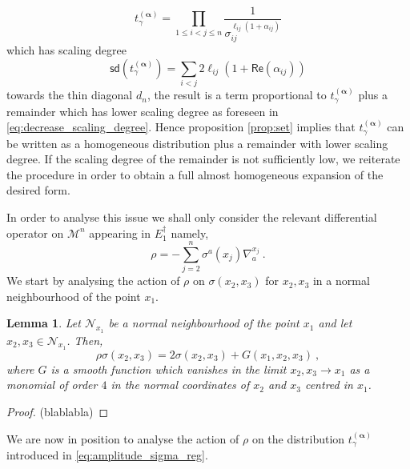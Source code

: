 \documentclass[12pt]{book}
\newcommand{\sd}{\mathsf{sd}}
\renewcommand{\Re}{\mathsf{Re}}
\newcommand{\Mcal}{\mathcal{M}}
\newcommand{\Ncal}{\mathcal{N}}
\theoremstyle{break}
\newtheorem{lemma}{Lemma}
\begin{document}
%
\begin{equation*}
t_\gamma^{(\boldsymbol{\alpha})}=\prod_{1\leq i < j \leq n } \frac{1}{\sigma_{ij}^{\ell_{ij}(1+ \alpha_{ij})}} 
\end{equation*}
%
which has scaling degree 
%
\begin{equation*}
\sd(t_\gamma^{(\boldsymbol{\alpha})}) = \sum_{i<j} 2 \ell_{ij}\left(1+ \Re(\alpha_{ij})\right) 
\end{equation*}
%
towards the thin diagonal $d_n$, the result is a term proportional to $t_\gamma^{(\boldsymbol{\alpha})}$ plus a remainder which has lower scaling degree as foreseen in \eqref{eq:decrease_scaling_degree}. Hence proposition \ref{prop:set} implies that $t_\gamma^{(\boldsymbol{\alpha})}$ can be written as a homogeneous distribution plus a remainder with lower scaling degree. If the scaling degree of the remainder is not sufficiently low, we reiterate the procedure in order to obtain a full almost homogeneous expansion of the desired form.


In order to analyse this issue we shall only consider the relevant differential operator on $\Mcal^n$ appearing in $E_1^\dagger$ namely,
%
\begin{equation*}
\rho = - \sum_{j=2}^n \sigma^a(x_j) \nabla^{x_j}_a \ .    
\end{equation*}
%
We start by analysing the action of $\rho$ on $\sigma(x_2,x_3)$ for $x_2,x_3$ in a normal neighbourhood of the point $x_1$.


\begin{lemma}\label{lem:rho_over_squared}
Let $\Ncal_{x_1}$ be a normal neighbourhood of the point $x_1$ and let $x_2,x_3 \in \Ncal_{x_1}$. Then,
%
\begin{equation*}
\rho \sigma(x_2,x_3) = 2\sigma(x_2,x_3) + G(x_1,x_2,x_3) \ ,
\end{equation*}
%
where $G$ is a smooth function which vanishes in the limit $x_2,x_3 \to x_1$ as a monomial of order $4$ in the normal coordinates of $x_2$ and $x_3$ centred in $x_1$. 
\end{lemma}


\begin{proof}
(blablabla)
\end{proof}


We are now in position to analyse the action of $\rho$ on the distribution $t_\gamma^{(\boldsymbol{\alpha})}$ introduced in \eqref{eq:amplitude_sigma_reg}.
\end{document}
